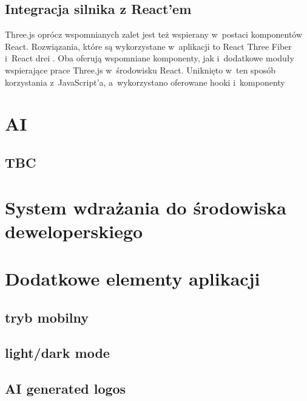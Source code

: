 \subsection{Integracja silnika z React'em}
Three.js oprócz wspomnianych zalet jest też wspierany w~postaci komponentów React.
Rozwiązania, które są wykorzystane w~aplikacji to React Three Fiber
\cite{ReactThreeFiber} i~React drei \cite{ReactDrei}. Oba oferują
wspomniane komponenty, jak i~dodatkowe moduły
wspierające prace Three.js w~środowisku React. Uniknięto w~ten sposób korzystania
z~JavaScript'a, a~wykorzystano oferowane hooki i~komponenty



\section{AI}

\subsection{TBC}


\section{System wdrażania do środowiska deweloperskiego}



\section{Dodatkowe elementy aplikacji}

\subsection{tryb mobilny}

\subsection{light/dark mode}

\subsection{AI generated logos}
